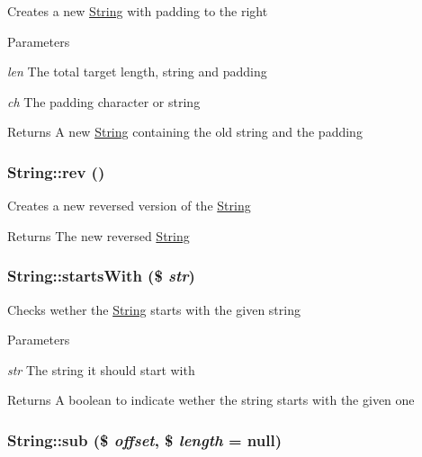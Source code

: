 \label{classString_a8ab0df0a7bbe4d99b84356403abf946f}
Creates a new \hyperlink{classString}{String} with padding to the right 
\begin{DoxyParams}{Parameters}
\item[{\em len}]The total target length, string and padding \item[{\em ch}]The padding character or string \end{DoxyParams}
\begin{DoxyReturn}{Returns}
A new \hyperlink{classString}{String} containing the old string and the padding 
\end{DoxyReturn}
\hypertarget{classString_a47b2739889b38abb582c4eee7d010f91}{
\subsubsection[{rev}]{\setlength{\rightskip}{0pt plus 5cm}String::rev ()}}
\label{classString_a47b2739889b38abb582c4eee7d010f91}
Creates a new reversed version of the \hyperlink{classString}{String} \begin{DoxyReturn}{Returns}
The new reversed \hyperlink{classString}{String} 
\end{DoxyReturn}
\hypertarget{classString_a0ab7fda4a4bc07fcc3ad0eb94cb96b22}{
\subsubsection[{startsWith}]{\setlength{\rightskip}{0pt plus 5cm}String::startsWith (\$ {\em str})}}
\label{classString_a0ab7fda4a4bc07fcc3ad0eb94cb96b22}
Checks wether the \hyperlink{classString}{String} starts with the given string 
\begin{DoxyParams}{Parameters}
\item[{\em str}]The string it should start with \end{DoxyParams}
\begin{DoxyReturn}{Returns}
A boolean to indicate wether the string starts with the given one 
\end{DoxyReturn}
\hypertarget{classString_a23eb86e0ad225b29dd3e02e637a42c37}{
\subsubsection[{sub}]{\setlength{\rightskip}{0pt plus 5cm}String::sub (\$ {\em offset}, \/  \$ {\em length} = {\ttfamily null})}}
